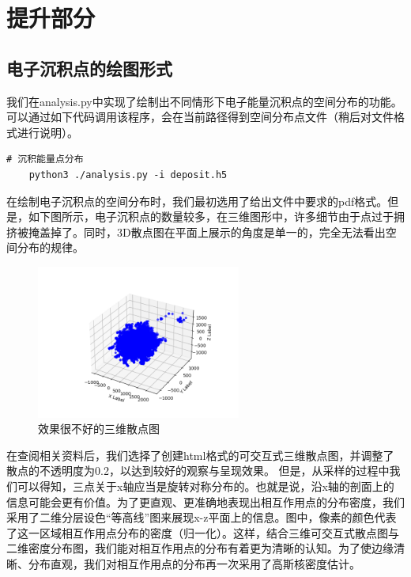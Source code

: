 \documentclass[12pt,a4paper]{article}%
\begin{document}
\newpage
\section{提升部分}

    \subsection{电子沉积点的绘图形式}
    
    我们在analysis.py中实现了绘制出不同情形下电子能量沉积点的空间分布的功能。可以通过如下代码调用该程序，会在当前路径得到空间分布点文件（稍后对文件格式进行说明）。
    \begin{lstlisting}[style=mystyle,label=code:bash]
    # 沉积能量点分布
    python3 ./analysis.py -i deposit.h5
    \end{lstlisting}
    
        在绘制电子沉积点的空间分布时，我们最初选用了给出文件中要求的pdf格式。但是，如下图所示，电子沉积点的数量较多，在三维图形中，许多细节由于点过于拥挤被掩盖掉了。同时，3D散点图在平面上展示的角度是单一的，完全无法看出空间分布的规律。
  
        \begin{figure}[hb]
            \centering
            \includegraphics[width=0.6\textwidth]{raw_analysis.png}
            \caption{效果很不好的三维散点图}
            \label{fig:raw_analysis}
        \end{figure}

        在查阅相关资料后，我们选择了创建html格式的可交互式三维散点图，并调整了散点的不透明度为0.2，以达到较好的观察与呈现效果。
        但是，从采样的过程中我们可以得知，三点关于x轴应当是旋转对称分布的。也就是说，沿x轴的剖面上的信息可能会更有价值。为了更直观、更准确地表现出相互作用点的分布密度，我们采用了二维分层设色“等高线”图来展现x-z平面上的信息。图中，像素的颜色代表了这一区域相互作用点分布的密度（归一化）。这样，结合三维可交互式散点图与二维密度分布图，我们能对相互作用点的分布有着更为清晰的认知。为了使边缘清晰、分布直观，我们对相互作用点的分布再一次采用了高斯核密度估计。
        
\end{document}
